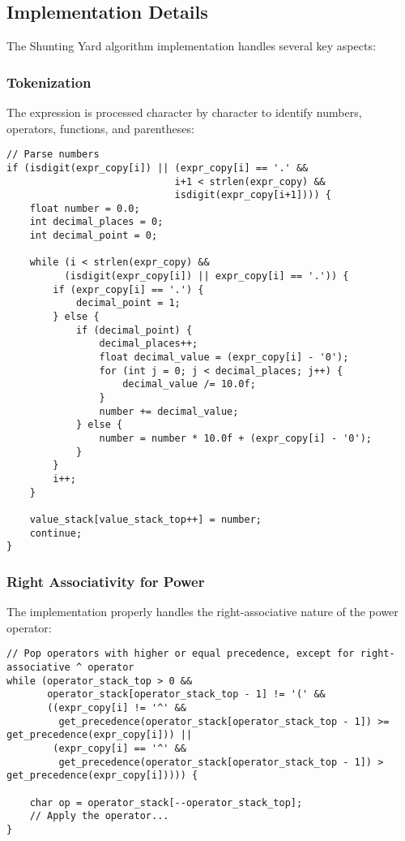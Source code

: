 \documentclass[12pt,a4paper]{article}
\begin{document}
\subsection{Implementation Details}

The Shunting Yard algorithm implementation handles several key aspects:

\subsubsection{Tokenization}
The expression is processed character by character to identify numbers, operators, functions, and parentheses:

\begin{lstlisting}
// Parse numbers
if (isdigit(expr_copy[i]) || (expr_copy[i] == '.' && 
                             i+1 < strlen(expr_copy) && 
                             isdigit(expr_copy[i+1]))) {
    float number = 0.0;
    int decimal_places = 0;
    int decimal_point = 0;
    
    while (i < strlen(expr_copy) && 
          (isdigit(expr_copy[i]) || expr_copy[i] == '.')) {
        if (expr_copy[i] == '.') {
            decimal_point = 1;
        } else {
            if (decimal_point) {
                decimal_places++;
                float decimal_value = (expr_copy[i] - '0');
                for (int j = 0; j < decimal_places; j++) {
                    decimal_value /= 10.0f;
                }
                number += decimal_value;
            } else {
                number = number * 10.0f + (expr_copy[i] - '0');
            }
        }
        i++;
    }
    
    value_stack[value_stack_top++] = number;
    continue;
}
\end{lstlisting}

\subsubsection{Right Associativity for Power}
The implementation properly handles the right-associative nature of the power operator:

\begin{lstlisting}
// Pop operators with higher or equal precedence, except for right-associative ^ operator
while (operator_stack_top > 0 && 
       operator_stack[operator_stack_top - 1] != '(' &&
       ((expr_copy[i] != '^' && 
         get_precedence(operator_stack[operator_stack_top - 1]) >= get_precedence(expr_copy[i])) ||
        (expr_copy[i] == '^' && 
         get_precedence(operator_stack[operator_stack_top - 1]) > get_precedence(expr_copy[i])))) {
    
    char op = operator_stack[--operator_stack_top];
    // Apply the operator...
}
\end{lstlisting}
\end{document}
